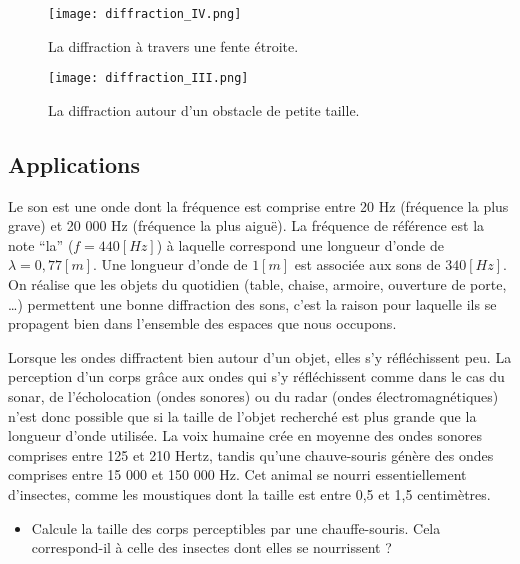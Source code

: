 \begin{figure}[h]
    \begin{minipage}{.5\textwidth}
        \centering
        \texttt{[image: diffraction\_IV.png]}
        \caption{La diffraction à travers une fente étroite.}
        \label{fig:diffraction_IV}
    \end{minipage}
    \begin{minipage}{.5\textwidth}
        \centering
        \texttt{[image: diffraction\_III.png]}
        \caption{La diffraction autour d'un obstacle de petite taille.}
        \label{fig:diffraction_III}
    \end{minipage}
\end{figure}

\subsection{Applications}

\begin{tcolorbox}[title=Ondes acoustiques]
    Le son est une onde dont la fréquence est comprise entre 20 Hz (fréquence la plus grave) et 20 000 Hz (fréquence la plus aiguë). La fréquence de référence est la note \enquote{la} (\(f=440[Hz]\)) à laquelle correspond une longueur d'onde de \(\lambda=0,77[m]\). Une longueur d'onde de \(1 [m]\) est associée aux sons de \(340[Hz]\). On réalise que les objets du quotidien (table, chaise, armoire, ouverture de porte, …) permettent une bonne diffraction des sons, c'est la raison pour laquelle ils se propagent bien dans l'ensemble des espaces que nous occupons.
\end{tcolorbox}

\begin{tcolorbox}[title=Écholocation]
    Lorsque les ondes diffractent bien autour d'un objet, elles s'y réfléchissent peu. La perception d'un corps grâce aux ondes qui s'y réfléchissent comme dans le cas du sonar, de l'écholocation (ondes sonores) ou du radar (ondes électromagnétiques) n'est donc possible que si la taille de l'objet recherché est plus grande que la longueur d'onde utilisée.
    La voix humaine crée en moyenne des ondes sonores comprises entre 125 et 210 Hertz, tandis qu'une chauve-souris génère des ondes comprises entre 15 000 et 150 000 Hz. Cet animal se nourri essentiellement d'insectes, comme les moustiques dont la taille est entre 0,5 et 1,5 centimètres.
    \begin{itemize}
        \item Calcule la taille des corps perceptibles par une chauffe-souris. Cela correspond-il à celle des insectes dont elles se nourrissent ?
    \end{itemize}
\end{tcolorbox}



